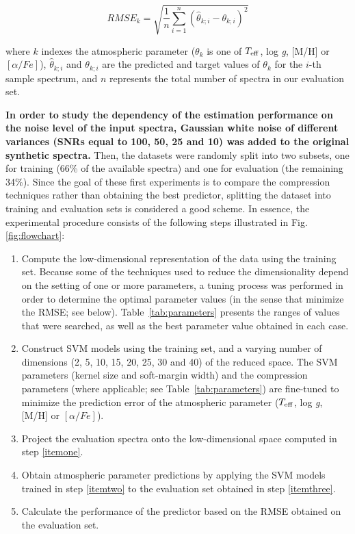 \documentclass[a4paper,fleqn,usenatbib]{mnras}
\begin{document}
{\begin{equation}
\label{eq:rmse}
RMSE_k=\sqrt{\frac{1}{n}\sum_{i=1}^{n}\left(\hat{\theta}_{k;i}-\theta_{k;i}\right)^{2}}
\end{equation}

where $k$ indexes the atmospheric parameter 
	(${\theta}_{k}$ is one of $T_{\rm eff}$, log \textit{g}, 
	[M/H] or $\left[ \alpha/Fe \right]$), $\hat{\theta}_{k;i}$ and $\theta_{k;i}$
	are the predicted and target values of ${\theta}_{k}$ for the $i$-th 
	sample spectrum, and $n$ represents the total number of spectra in our evaluation set.
  
{\bf In order to study the dependency of the estimation performance on the
noise level of the input spectra, Gaussian white noise of different
variances (SNRs equal to 100, 50, 25 and 10) was added to the original
synthetic spectra.} 
Then, the datasets were randomly split into two subsets, one for training
(66\% of the available spectra) and one for evaluation (the remaining
34\%). Since the goal of these first experiments is to compare the
compression techniques rather than obtaining the best predictor,
splitting the dataset into training and evaluation sets is considered
a good scheme. In essence, the experimental procedure consists of the
following steps illustrated in Fig.~ \ref{fig:flowchart}:

\begin{enumerate}
\item \label{itemone} Compute the low-dimensional representation of
  the data using the training set. Because some of the techniques used
  to reduce the dimensionality depend on the setting of one or more
  parameters, a tuning process was performed in order to determine the
  optimal parameter values (in the sense that minimize the RMSE; 
  see below). Table~\ref{tab:parameters} presents the ranges of 
  values that were searched, as well as the best parameter value
  obtained in each case.
\item \label{itemtwo} Construct SVM models using the training set, and a varying
  number of dimensions (2, 5, 10, 15, 20, 25, 30 and 40) of the
  reduced space. The SVM parameters (kernel size and soft-margin
  width) and the compression parameters (where applicable; see 
  Table~\ref{tab:parameters}) are fine-tuned to minimize the prediction error of the
  atmospheric parameter ($T_{\rm eff}$, log \textit{g}, [M/H] or 
  $\left[ \alpha/Fe \right]$).
\item \label{itemthree} Project the evaluation spectra onto the
  low-dimensional space computed in step \ref{itemone}.
\item Obtain atmospheric parameter predictions by applying the SVM
  models trained in step \ref{itemtwo} to the evaluation set obtained in
  step \ref{itemthree}.
\item Calculate the performance of the predictor based on the RMSE
  obtained on the evaluation set.
\end{enumerate}

}
\end{document}
